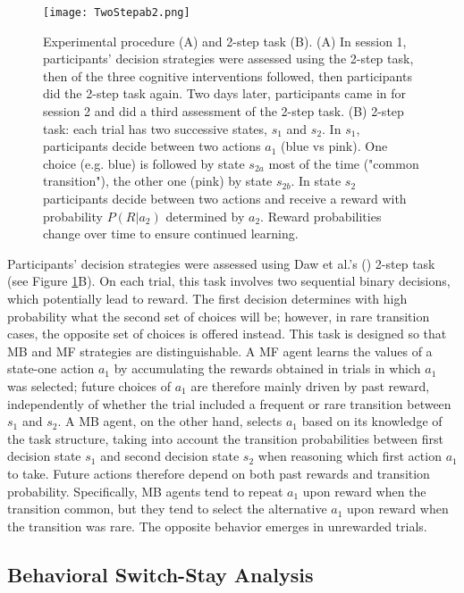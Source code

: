 \documentclass[11pt]{article} %
\begin{document}
\begin{figure}
	\texttt{[image: TwoStepab2.png]}
	\caption{Experimental procedure (A) and 2-step task (B). (A) In session 1, participants' decision strategies were assessed using the 2-step task, then of the three cognitive interventions followed, then participants did the 2-step task again. Two days later, participants came in for session 2 and did a third assessment of the 2-step task. (B) 2-step task: each trial has two successive states, $s_{1}$ and $s_{2}$. In $s_{1}$, participants decide between two actions $a_{1}$ (blue vs pink). One choice (e.g. blue) is followed by state $s_{2a}$ most of the time ("common transition"), the other one (pink) by state $s_{2b}$. In state $s_{2}$ participants decide between two actions and receive a reward with probability $P(R|a_{2})$ determined by $a_{2}$. Reward probabilities change over time to ensure continued learning.}
	\label{TwoStep}
\end{figure}

Participants' decision strategies were assessed using Daw et al.'s (\cite{daw_model-based_2011}) 2-step task (see Figure \ref{TwoStep}B). On each trial, this task involves two sequential binary decisions, which potentially lead to reward. The first decision determines with high probability what the second set of choices will be; however, in rare transition cases, the opposite set of choices is offered instead. This task is designed so that MB and MF strategies are distinguishable. A MF agent learns the values of a state-one action $a_{1}$ by accumulating the rewards obtained in trials in which $a_{1}$ was selected; future choices of $a_{1}$ are therefore mainly driven by past reward, independently of whether the trial included a frequent or rare transition between $s_{1}$ and $s_{2}$. A MB agent, on the other hand, selects $a_{1}$ based on its knowledge of the task structure, taking into account the transition probabilities between first decision state $s_{1}$ and second decision state $s_{2}$ when reasoning which first action $a_{1}$ to take. Future actions therefore depend on both past rewards and transition probability. Specifically, MB agents tend to repeat $a_{1}$ upon reward when the transition common, but they tend to select the alternative $a_{1}$ upon reward when the transition was rare. The opposite behavior emerges in unrewarded trials.

\subsection{Behavioral Switch-Stay Analysis}
\end{document}
